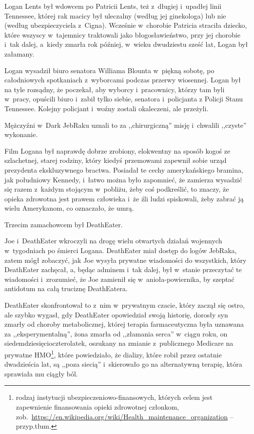 \documentclass[oneside,polish,11pt,sfheadings]{mwbk}
\begin{document}
Logan Lents był wdowcem po Patricii Lents, też z~długiej i~upadłej linii
Tennessee, której rak macicy był uleczalny (według jej ginekologa) lub
nie (według ubezpieczyciela z~Cigna). Wcześnie w~chorobie Patricia
straciła dziecko, które wszyscy w~tajemnicy traktowali jako
błogosławieństwo, przy jej chorobie i~tak dalej, a~kiedy zmarła rok
później, w~wieku dwudziestu sześć lat, Logan był załamany.

Logan wysadził biuro senatora Williama Blounta w~piękną sobotę, po
całodniowych spotkaniach z~wyborcami podczas przerwy wiosennej. Logan
był na tyle rozsądny, że poczekał, aby wyborcy i~pracownicy, którzy tam
byli w~pracy, opuścili biuro i~zabił tylko siebie, senatora i~policjanta
z Policji Stanu Tennessee. Kolejny policjant i~woźny zostali okaleczeni,
ale przeżyli.

Mężczyźni w~Dark JebRaku uznali to za ,,chirurgiczną'' misję i~chwalili
,,czyste'' wykonanie.

Film Logana był naprawdę dobrze zrobiony, elokwentny na sposób kogoś ze
szlachetnej, starej rodziny, który kiedyś przemowami zapewnił sobie
urząd prezydenta ekskluzywnego bractwa. Posiadał te cechy amerykańskiego
bramina, jak południowy Kennedy, i~łatwo można było zapomnieć, że
zamierza wysadzić się razem z~każdym stojącym w~pobliżu, żeby coś
podkreślić, to znaczy, że opieka zdrowotna jest prawem człowieka i~że
źli ludzi spiskowali, żeby zabrać ją wielu Amerykanom, co oznaczało, że
umrą.

Trzecim zamachowcem był DeathEater.

Joe i~DeathEater wkroczyli na drogę wielu otwartych działań wojennych w~tygodniach po śmierci Logana. DeathEater miał dostęp do logów JebRaka,
zatem mógł zobaczyć, jak Joe wysyła prywatne wiadomości do wszystkich,
który DeathEater zachęcał, a, będąc adminem i~tak dalej, był w~stanie
przeczytać te wiadomości i~zrozumieć, że Joe zamienił się w~anioła-powiernika, by szeptać antidotum na całą truciznę DeathEatera.

DeathEater skonfrontował to z~nim w~prywatnym czacie, który zaczął się
ostro, ale szybko wygasł, gdy DeathEater opowiedział swoją historię,
dorosły syn zmarły od choroby metabolicznej, której terapia
farmaceutyczna była uznawana za ,,eksperymentalną'', żona zmarła od
,,złamania serca'' w~ciągu roku, on siedemdziesięcioczterolatek,
oszukany na zmianie z~publicznego Medicare na prywatne HMO\footnote{ rodzaj
instytucji ubezpieczeniowo-finansowych, których celem jest zapewnienie
finansowania opieki zdrowotnej członkom,
zob.~\url{https://en.wikipedia.org/wiki/Health\_maintenance\_organization}
-- przyp.tłum.}, które powiedziało, że dializy, które robił przez
ostatnie dwadzieścia lat, są ,,poza siecią'' i~skierowało go na
alternatywną terapię, która sprawiała mu ciągły ból.
\end{document}
